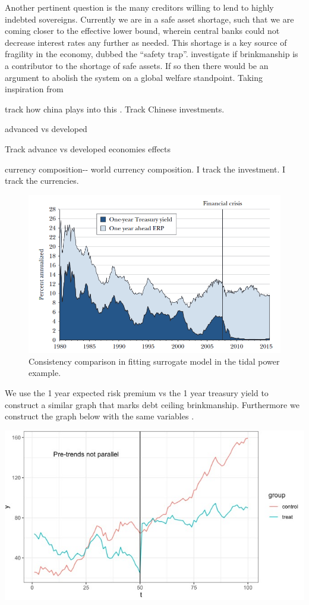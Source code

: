 \documentclass[
  12pt]{article}
\begin{document}
Another pertinent question is the many creditors willing to lend to
highly indebted sovereigns. Currently we are in a safe asset shortage,
such that we are coming closer to the effective lower bound, wherein
central banks could not decrease interest rates any further as needed.
This shortage is a key source of fragility in the economy, dubbed the
``safety trap''. \citet{caballero2017We} investigate if brinkmanship is
a contributor to the shortage of safe assets. If so then there would be
an argument to abolish the system on a global welfare standpoint. Taking
inspiration from

track how china plays into this . Track Chinese investments.

advanced vs developed

Track advance vs developed economies effects

currency composition-\/- world currency composition. I track the
investment. I track the currencies.

\begin{figure}

{\centering \includegraphics{style-guide/1_year_ERP.png}

}

\caption{\label{fig-first}Consistency comparison in fitting surrogate
model in the tidal power example.}

\end{figure}

We use the 1 year expected risk premium vs the 1 year treasury yield to
construct a similar graph that marks debt ceiling brinkmanship.
Furthermore we construct the graph below with the same variables
\citet{duarte2015}.

\includegraphics{style-guide/1_year_ERP_parallel_trends.jpeg}
\end{document}
